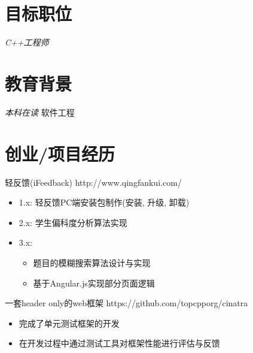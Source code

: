 \documentclass{resume}
\begin{document}



\begin{multicols}{2} %

\section{\faSearch 目标职位}
\textit{C++工程师}

\section{\faGraduationCap 教育背景}
\textit{本科在读} 软件工程

\section{\faStar 创业/项目经历}
\begin{onehalfspacing}
轻反馈(iFeedback)
\newline
http://www.qingfankui.com/
\begin{itemize}
  \item 1.x: 轻反馈PC端安装包制作(安装, 升级, 卸载)
  \item 2.x: 学生偏科度分析算法实现
  \item 3.x:
  \begin{itemize} 
    \item 题目的模糊搜索算法设计与实现 
    \item 基于Angular.js实现部分页面逻辑
  \end{itemize}
\end{itemize}
\end{onehalfspacing}

\begin{onehalfspacing}
一套header only的web框架 
\newline
https://github.com/topcpporg/cinatra
\begin{itemize}
  \item 完成了单元测试框架的开发
  \item 在开发过程中通过测试工具对框架性能进行评估与反馈
\end{itemize}
\end{onehalfspacing}


\end{multicols}
\end{document}

